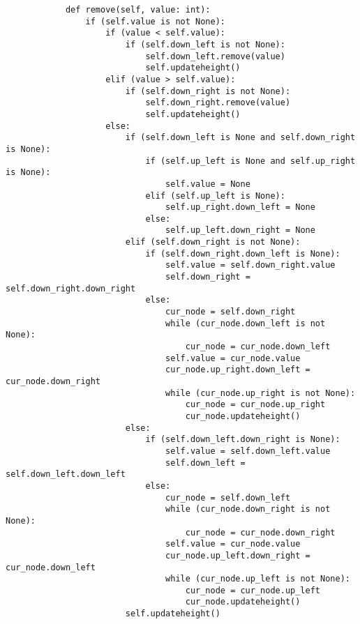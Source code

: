 \begin{lstlisting}
            def remove(self, value: int):
                if (self.value is not None):
                    if (value < self.value):
                        if (self.down_left is not None):
                            self.down_left.remove(value)
                            self.updateheight()
                    elif (value > self.value):
                        if (self.down_right is not None):
                            self.down_right.remove(value)
                            self.updateheight()
                    else:
                        if (self.down_left is None and self.down_right is None):
                            if (self.up_left is None and self.up_right is None):
                                self.value = None
                            elif (self.up_left is None):
                                self.up_right.down_left = None
                            else:
                                self.up_left.down_right = None
                        elif (self.down_right is not None):
                            if (self.down_right.down_left is None):
                                self.value = self.down_right.value
                                self.down_right = self.down_right.down_right
                            else:
                                cur_node = self.down_right
                                while (cur_node.down_left is not None):
                                    cur_node = cur_node.down_left
                                self.value = cur_node.value
                                cur_node.up_right.down_left = cur_node.down_right
                                while (cur_node.up_right is not None):
                                    cur_node = cur_node.up_right
                                    cur_node.updateheight()
                        else:
                            if (self.down_left.down_right is None):
                                self.value = self.down_left.value
                                self.down_left = self.down_left.down_left
                            else:
                                cur_node = self.down_left
                                while (cur_node.down_right is not None):
                                    cur_node = cur_node.down_right
                                self.value = cur_node.value
                                cur_node.up_left.down_right = cur_node.down_left
                                while (cur_node.up_left is not None):
                                    cur_node = cur_node.up_left
                                    cur_node.updateheight()
                        self.updateheight()


\end{lstlisting}
